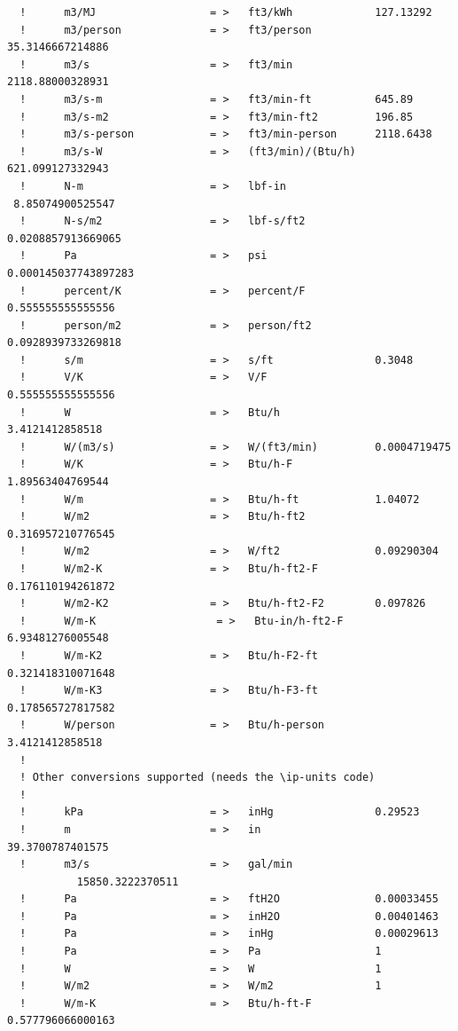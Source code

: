 \begin{lstlisting}
  !      m3/MJ                  = >   ft3/kWh             127.13292
  !      m3/person              = >   ft3/person          35.3146667214886
  !      m3/s                   = >   ft3/min             2118.88000328931
  !      m3/s-m                 = >   ft3/min-ft          645.89
  !      m3/s-m2                = >   ft3/min-ft2         196.85
  !      m3/s-person            = >   ft3/min-person      2118.6438
  !      m3/s-W                 = >   (ft3/min)/(Btu/h)   621.099127332943
  !      N-m                    = >   lbf-in              8.85074900525547
  !      N-s/m2                 = >   lbf-s/ft2           0.0208857913669065
  !      Pa                     = >   psi                 0.000145037743897283
  !      percent/K              = >   percent/F           0.555555555555556
  !      person/m2              = >   person/ft2          0.0928939733269818
  !      s/m                    = >   s/ft                0.3048
  !      V/K                    = >   V/F                 0.555555555555556
  !      W                      = >   Btu/h               3.4121412858518
  !      W/(m3/s)               = >   W/(ft3/min)         0.0004719475
  !      W/K                    = >   Btu/h-F             1.89563404769544
  !      W/m                    = >   Btu/h-ft            1.04072
  !      W/m2                   = >   Btu/h-ft2           0.316957210776545
  !      W/m2                   = >   W/ft2               0.09290304
  !      W/m2-K                 = >   Btu/h-ft2-F         0.176110194261872
  !      W/m2-K2                = >   Btu/h-ft2-F2        0.097826
  !      W/m-K                   = >   Btu-in/h-ft2-F      6.93481276005548
  !      W/m-K2                 = >   Btu/h-F2-ft         0.321418310071648
  !      W/m-K3                 = >   Btu/h-F3-ft         0.178565727817582
  !      W/person               = >   Btu/h-person        3.4121412858518
  !
  ! Other conversions supported (needs the \ip-units code)
  !
  !      kPa                    = >   inHg                0.29523
  !      m                      = >   in                  39.3700787401575
  !      m3/s                   = >   gal/min             15850.3222370511
  !      Pa                     = >   ftH2O               0.00033455
  !      Pa                     = >   inH2O               0.00401463
  !      Pa                     = >   inHg                0.00029613
  !      Pa                     = >   Pa                  1
  !      W                      = >   W                   1
  !      W/m2                   = >   W/m2                1
  !      W/m-K                  = >   Btu/h-ft-F          0.577796066000163

\end{lstlisting}
